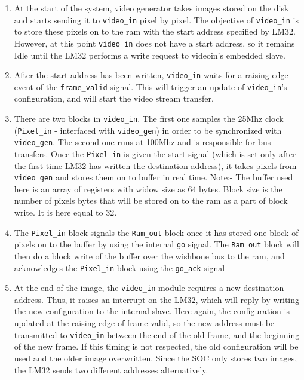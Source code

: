 \begin{enumerate}

\item At the start of the system, video generator takes images stored on the disk and starts sending it to \texttt{video\_in} pixel by pixel. The objective of \texttt{video\_in} is to store these pixels on to the ram with the start address specified by LM32. However, at this point \texttt{video\_in} does not have a start address, so it remains Idle until the LM32 performs a write request to videoin's embedded slave.

\item After the start address has been written, \texttt{video\_in} waits for a raising edge event of the \texttt{frame\_valid} signal. This will trigger an update of \texttt{video\_in}'s configuration, and will start the video stream transfer.

\item There are two blocks in \texttt{video\_in}. The first one samples the 25Mhz clock (\texttt{Pixel\_in} - interfaced with \texttt{video\_gen}) in order to be synchronized with \texttt{video\_gen}. The second one runs at 100Mhz and is responsible for bus transfers. Once the \texttt{Pixel-in} is given the start signal (which is set only after the first time LM32 has written the destination address), it takes pixels from \texttt{video\_gen} and stores them on to buffer in real time.
Note:- The buffer used here is an array of registers with widow size as 64 bytes. Block size is the number of pixels bytes that will be stored on to the ram as a part of block write. It is here equal to 32.

\item The \texttt{Pixel\_in} block signals the \texttt{Ram\_out} block once it has stored one block of pixels on to the buffer by using the internal \texttt{go} signal. The \texttt{Ram\_out} block will then do a block write of the buffer over the wishbone bus to the ram, and acknowledges the \texttt{Pixel\_in} block using the \texttt{go\_ack} signal

\item At the end of the image, the \texttt{video\_in} module requires a new destination address. Thus, it raises an interrupt on the LM32, which will reply by writing the new configuration to the internal slave. Here again, the configuration is updated at the raising edge of frame valid, so the new address must be transmitted to \texttt{video\_in} between the end of the old frame, and the beginning of the new frame. If this timing is not respected, the old configuration will be used and the older image overwritten. Since the SOC only stores two images, the LM32 sends two different addresses alternatively.


\end{enumerate}
